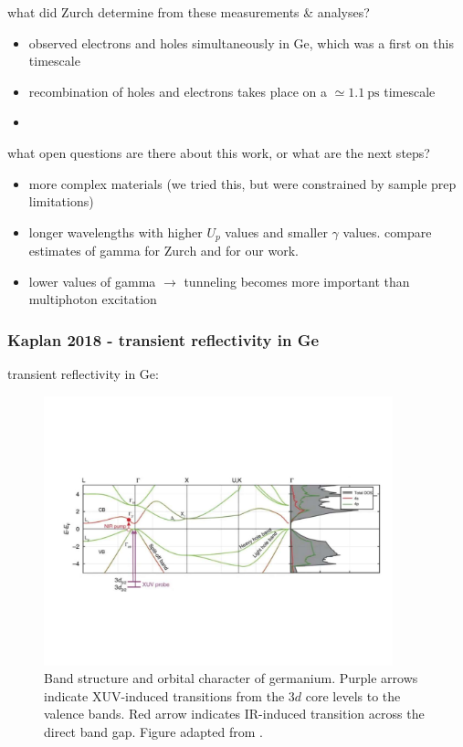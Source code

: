 what did Zurch determine from these measurements \& analyses?
\begin{itemize}
	\item observed electrons and holes simultaneously in Ge, which was a first on this timescale
	\item recombination of holes and electrons takes place on a $\simeq 1.1 \ \textrm{ps}$ timescale
	\item 
\end{itemize}

what open questions are there about this work, or what are the next steps?
\begin{itemize}
	\item more complex materials (we tried this, but were constrained by sample prep limitations)
	\item longer wavelengths with higher $U_p$ values and smaller $\gamma$ values. compare estimates of gamma for Zurch and for our work.
	\item lower values of gamma $\rightarrow$ tunneling becomes more important than multiphoton excitation
\end{itemize}

\subsubsection{Kaplan 2018 - transient reflectivity in Ge}
transient reflectivity in Ge: \cite{kaplanFemtosecondTrackingCarrier2018}



\begin{figure}
	\centering
	\includegraphics[width=0.9\textwidth]{figures/chap4/Ge_band_diagram_Zurch2017.pdf}
	\caption{Band structure and orbital character of germanium. Purple arrows indicate XUV-induced transitions from the $3d$ core levels to the valence bands. Red arrow indicates IR-induced transition across the direct band gap. Figure adapted from \cite{zurchDirectSimultaneousObservation2017}.}
	\label{fig:Ge_band_diagram}
\end{figure}





